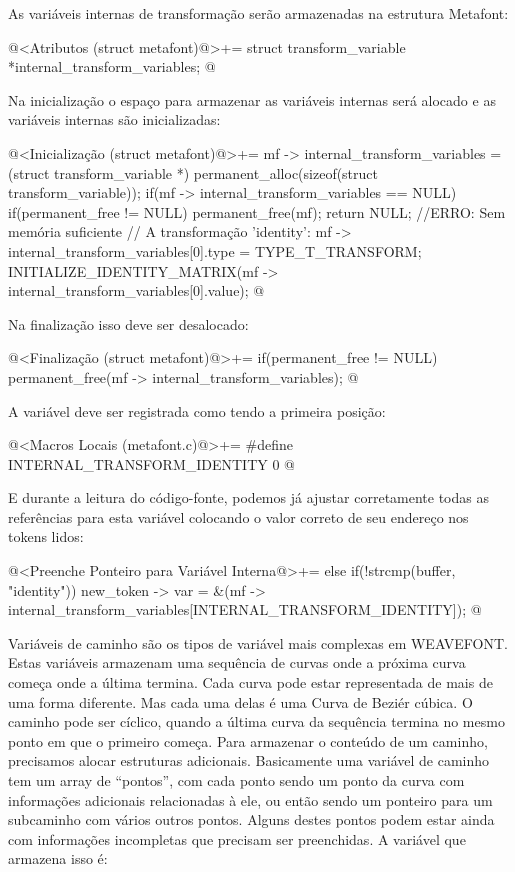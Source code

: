 As variáveis internas de transformação serão armazenadas na estrutura
Metafont:

\iniciocodigo
@<Atributos (struct metafont)@>+=
struct transform_variable *internal_transform_variables;
@
\fimcodigo

Na inicialização o espaço para armazenar as variáveis internas será
alocado e as variáveis internas são inicializadas:

\iniciocodigo
@<Inicialização (struct metafont)@>+=
mf -> internal_transform_variables =
  (struct transform_variable *)
    permanent_alloc(sizeof(struct transform_variable));
if(mf -> internal_transform_variables == NULL){
  if(permanent_free != NULL)
    permanent_free(mf);
  return NULL; //ERRO: Sem memória suficiente
}
// A transformação 'identity':
mf -> internal_transform_variables[0].type = TYPE_T_TRANSFORM;
INITIALIZE_IDENTITY_MATRIX(mf -> internal_transform_variables[0].value);
@
\fimcodigo

Na finalização isso deve ser desalocado:

\iniciocodigo
@<Finalização (struct metafont)@>+=
if(permanent_free != NULL)
  permanent_free(mf -> internal_transform_variables);
@
\fimcodigo

A variável  deve ser registrada como tendo a
primeira posição:

\iniciocodigo
@<Macros Locais (metafont.c)@>+=
#define INTERNAL_TRANSFORM_IDENTITY 0
@
\fimcodigo

E durante a leitura do código-fonte, podemos já ajustar corretamente
todas as referências para esta variável colocando o valor correto de
seu endereço nos tokens lidos:

\iniciocodigo
@<Preenche Ponteiro para Variável Interna@>+=
else if(!strcmp(buffer, "identity"))
  new_token -> var =
          &(mf -> internal_transform_variables[INTERNAL_TRANSFORM_IDENTITY]);
@
\fimcodigo


Variáveis de caminho são os tipos de variável mais complexas em
WEAVEFONT. Estas variáveis armazenam uma sequência de curvas onde a
próxima curva começa onde a última termina. Cada curva pode estar
representada de mais de uma forma diferente. Mas cada uma delas é uma
Curva de Beziér cúbica. O caminho pode ser cíclico, quando a última
curva da sequência termina no mesmo ponto em que o primeiro
começa. Para armazenar o conteúdo de um caminho, precisamos alocar
estruturas adicionais. Basicamente uma variável de caminho tem um
array de ``pontos'', com cada ponto sendo um ponto da curva com
informações adicionais relacionadas à ele, ou então sendo um ponteiro
para um subcaminho com vários outros pontos. Alguns destes pontos
podem estar ainda com informações incompletas que precisam ser
preenchidas. A variável que armazena isso é:

